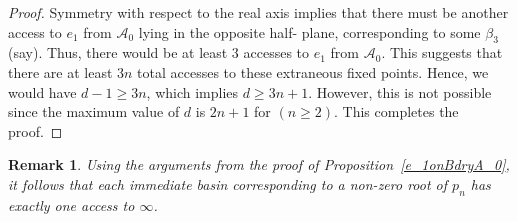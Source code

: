 \documentclass[12pt]{article}
\newtheorem{lem}{Lemma}[section]
\newtheorem{rem}{Remark}[section]
\newcommand{\red}{\color{red}}
\begin{document}
\begin{proof}
	Symmetry with respect to the real axis implies that there must be another access to $e_{1}$ from $\mathcal{A}_0$ lying in the opposite half- plane, corresponding to some $\beta_{3}$ (say). Thus, there would be at least $3$ accesses to $e_{1}$ from $\mathcal{A}_{0}$.  This suggests that there are at least $3n$ total accesses to these extraneous fixed points. Hence, we would have $d-1 \ge 3n$, which implies $d \geq 3n+1$. However, this is not possible since the maximum value of $d$ is $2n+1$ for $(n \geq 2)$. This completes the proof.
\end{proof} 

\begin{rem}\label{one_access-A1}
	Using the arguments from the proof of Proposition~\ref{e_1onBdryA_0}, it follows that each immediate basin corresponding to a non-zero root of $p_n$ has exactly one access to $\infty$.
\end{rem}	

\end{document}
